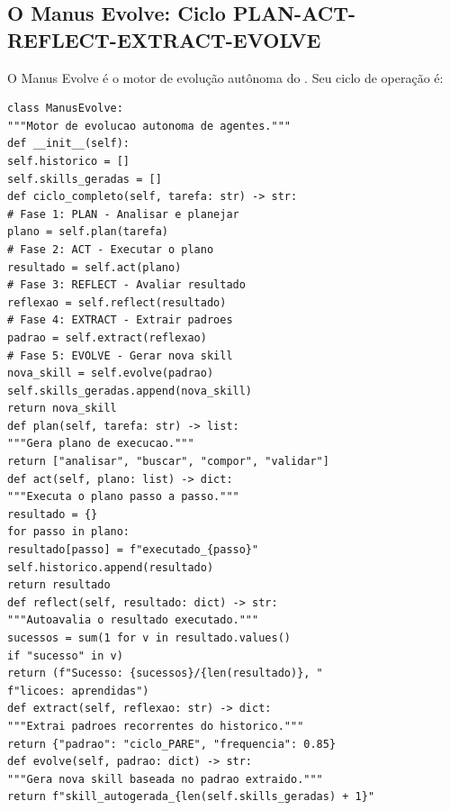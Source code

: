 \subsection{O Manus Evolve: Ciclo PLAN-ACT-REFLECT-EXTRACT-EVOLVE}
O Manus Evolve \cite{opencode2026manus} é o motor de evolução autônoma do
\opencodeeco{}. Seu ciclo de operação é:
\begin{lstlisting}[style=pythonstyle]
class ManusEvolve:
"""Motor de evolucao autonoma de agentes."""
def __init__(self):
self.historico = []
self.skills_geradas = []
def ciclo_completo(self, tarefa: str) -> str:
# Fase 1: PLAN - Analisar e planejar
plano = self.plan(tarefa)
# Fase 2: ACT - Executar o plano
resultado = self.act(plano)
# Fase 3: REFLECT - Avaliar resultado
reflexao = self.reflect(resultado)
# Fase 4: EXTRACT - Extrair padroes
padrao = self.extract(reflexao)
# Fase 5: EVOLVE - Gerar nova skill
nova_skill = self.evolve(padrao)
self.skills_geradas.append(nova_skill)
return nova_skill
def plan(self, tarefa: str) -> list:
"""Gera plano de execucao."""
return ["analisar", "buscar", "compor", "validar"]
def act(self, plano: list) -> dict:
"""Executa o plano passo a passo."""
resultado = {}
for passo in plano:
resultado[passo] = f"executado_{passo}"
self.historico.append(resultado)
return resultado
def reflect(self, resultado: dict) -> str:
"""Autoavalia o resultado executado."""
sucessos = sum(1 for v in resultado.values()
if "sucesso" in v)
return (f"Sucesso: {sucessos}/{len(resultado)}, "
f"licoes: aprendidas")
def extract(self, reflexao: str) -> dict:
"""Extrai padroes recorrentes do historico."""
return {"padrao": "ciclo_PARE", "frequencia": 0.85}
def evolve(self, padrao: dict) -> str:
"""Gera nova skill baseada no padrao extraido."""
return f"skill_autogerada_{len(self.skills_geradas) + 1}"
\end{lstlisting}
